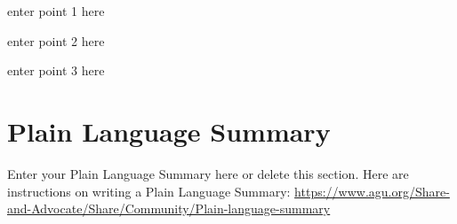 \documentclass{agujournal2019}
\begin{document}


\begin{keypoints}
\item enter point 1 here
\item enter point 2 here
\item enter point 3 here
\end{keypoints}

%
%

%
%


\begin{abstract}
[ enter your Abstract here ]
\end{abstract}

\section*{Plain Language Summary}
Enter your Plain Language Summary here or delete this section.
Here are instructions on writing a Plain Language Summary: 
\url{https://www.agu.org/Share-and-Advocate/Share/Community/Plain-language-summary}
\end{document}
